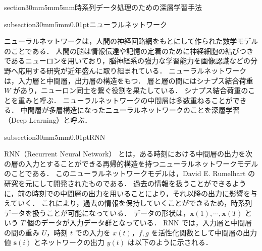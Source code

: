 \documentclass[twocolumn,fleqn,10pt]{jarticle}
\makeatletter
\renewcommand{\section}{\@startsection
{section}{3}{0mm}{5mm}{5mm}{\bfseries \normalsize}}
\renewcommand{\subsection}{\@startsection
{subsection}{3}{0mm}{5mm}{0.01pt}{\bfseries \normalsize}}
\makeatother
\begin{document}
\section{時系列データ処理のための深層学習手法}



\subsection{ニューラルネットワーク}

ニューラルネットワークは，人間の神経回路網をもとにして作られた数学モデルのことである．
人間の脳は情報伝達や記憶の定着のために神経細胞の結びつきであるニューロンを用いており，脳神経系の強力な学習能力を画像認識などの分野へ応用する研究が近年盛んに取り組まれている．
ニューラルネットワークは，入力層と中間層，出力層の構造をもつ．
層と層の間にはシナプス結合荷重 $W$ があり，ニューロン同士を繋ぐ役割を果たしている．
シナプス結合荷重のことを重みと呼ぶ．
ニューラルネットワークの中間層は多数重ねることができる．
中間層が多層構造になったニューラルネットワークのことを深層学習（Deep Learning）と呼ぶ．












\subsection{RNN}

RNN（Recurrent Neural Network） とは，ある時刻における中間層の出力を次の層の入力とすることができる再帰的構造を持つニューラルネットワークモデルのことである．
このニューラルネットワークモデルは，David E. Rumelhart \cite{rnn}の研究を元にして開発されたものである．
過去の情報を扱うことができるように，前の時刻での中間層の出力を用いることにより，それ以降の出力に影響を与えていく．
これにより，過去の情報を保持していくことができるため，時系列データを扱うことが可能になっている．
データの形状は，$\bm{x}(1),\cdots, \bm{x}(T)$ という $T$ 個のデータが入力データ群となっている．
RNN では，入力層と中間層の間の重み $U$，時刻 $t$ での入力を $x(t)$，$f, g$ を活性化関数として中間層の出力値 $\bm{s}(i)$ とネットワークの出力 $y(t)$ は以下のように示される．
\end{document}
